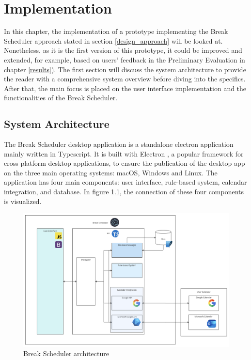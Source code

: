\documentclass{hasel_thesis}
\begin{document}
\chapter{Implementation} \label{implementation}

In this chapter, the implementation of a prototype implementing the Break Scheduler approach stated in section \ref{design_approach} will be looked at. Nonetheless, as it is the first version of this prototype, it could be improved and extended, for example, based on users' feedback in the Preliminary Evaluation in chapter \ref{results}). The first section will discuss the system architecture to provide the reader with a comprehensive system overview before diving into the specifics. After that, the main focus is placed on the user interface implementation and the functionalities of the Break Scheduler.

\section{System Architecture}

The Break Scheduler desktop application is a standalone electron application mainly written in Typescript. It is built with Electron \cite{electron}, a popular framework for cross-platform desktop applications, to ensure the publication of the desktop app on the three main operating systems: macOS, Windows and Linux. The application has four main components: user interface, rule-based system, calendar integration, and database. In figure \ref{fig:architectur}, the connection of these four components is visualized.


\begin{figure}[htp]
    \centering
    \includegraphics[width=14cm]{hasel_thesis/images/architectur.png}
    \caption{Break Scheduler architecture}
    \label{fig:architectur}
\end{figure}
\end{document}
